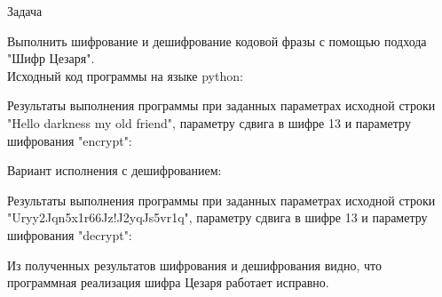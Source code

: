 \begin{center}
    Задача
\end{center}
Выполнить шифрование и дешифрование кодовой фразы с помощью подхода "Шифр Цезаря".\\

Исходный код программы на языке python:



Результаты выполнения программы при заданных параметрах исходной строки "Hello darkness my old friend", параметру сдвига в шифре 13 и параметру шифрования "encrypt":



\newpage{}

Вариант исполнения с дешифрованием:


Результаты выполнения программы при заданных параметрах исходной строки "Uryy2Jqn5x1r66Jz!J2yqJs5vr1q", параметру сдвига в шифре 13 и параметру шифрования "decrypt":


Из полученных результатов шифрования и дешифрования видно, что программная реализация шифра Цезаря работает исправно.

\newpage{}
